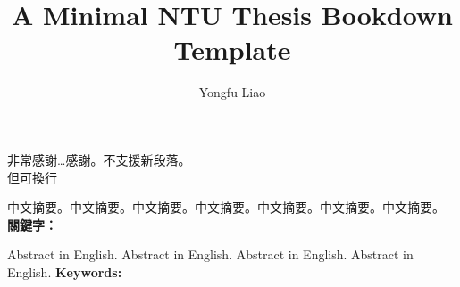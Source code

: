 \documentclass[oneside]{ntuthesis}
\institute{Department of Psychology}{心理學系}
\title{A Minimal NTU Thesis Bookdown Template}{臺灣大學論文 Bookdown 模板}
\author{Yongfu Liao}{廖永賦}
\begin{document}
\frontmatter

\makecover

\clearpage


\ifdefined\withcertification
  
\else
  \makecertification
\fi


\begin{acknowledgementszh}
非常感謝\ldots{}感謝。不支援新段落。\\
但可換行
\end{acknowledgementszh}

%


\begin{abstractzh}
中文摘要。中文摘要。中文摘要。中文摘要。中文摘要。中文摘要。中文摘要。
\bigbreak
\noindent \textbf{關鍵字：}{\, \makeatletter \@keywordszh \makeatother}
\end{abstractzh}


\begin{abstracten}
Abstract in English. Abstract in English. Abstract in English. Abstract
in English.
\bigbreak
\noindent \textbf{Keywords:}{\, \makeatletter \@keywordsen \makeatother}
\end{abstracten}
\end{document}
